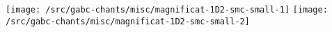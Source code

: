 \texttt{[image: /src/gabc-chants/misc/magnificat-1D2-smc-small-1]}%
\ifx\betweenLilyPondSystem \undefined
  \linebreak
\else
  \expandafter{}%
\fi
\texttt{[image: /src/gabc-chants/misc/magnificat-1D2-smc-small-2]}%
